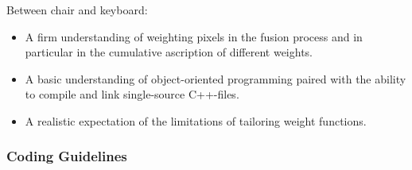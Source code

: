 Between chair and keyboard:

\begin{itemize}
\item
  A firm understanding of weighting pixels in the fusion process and in particular in the
  cumulative ascription of different weights.

\item
  A basic understanding of object-oriented programming paired with the ability to compile and
  link single-source C++-files.

\item
  A realistic expectation of the limitations of tailoring weight functions.
\end{itemize}


\subsubsection[Coding Guidelines]{\label{sec:coding-guidelines}%
  Coding Guidelines}

